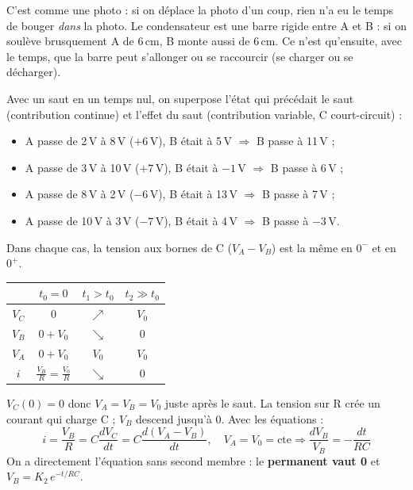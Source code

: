 \begin{goatbox}
C'est comme une photo : si on déplace la photo d'un coup, rien n'a eu le temps de bouger
\emph{dans} la photo. Le condensateur est une barre rigide entre A et B : si on soulève
brusquement A de 6\,cm, B monte aussi de 6\,cm. Ce n'est qu'ensuite, avec le temps, que la
barre peut \og s'allonger ou se raccourcir\fg{} (se charger ou se décharger).
\end{goatbox}


\begin{exbox}[title={Exemples de sauts (superposition : état avant + effet du saut)}]
Avec un saut en un temps nul, on superpose l'état qui précédait le saut (contribution
\og continue\fg{}) et l'effet du saut (contribution \og variable\fg{}, C court-circuit) :
\begin{itemize}
  \item A passe de 2\,V à 8\,V ($+6$\,V), B était à 5\,V $\Rightarrow$ B passe à 11\,V ;
  \item A passe de 3\,V à 10\,V ($+7$\,V), B était à $-1$\,V $\Rightarrow$ B passe à 6\,V ;
  \item A passe de 8\,V à 2\,V ($-6$\,V), B était à 13\,V $\Rightarrow$ B passe à 7\,V ;
  \item A passe de 10\,V à 3\,V ($-7$\,V), B était à 4\,V $\Rightarrow$ B passe à $-3$\,V.
\end{itemize}
Dans chaque cas, la tension aux bornes de C ($V_A - V_B$) est la même en $0^-$ et en $0^+$.
\end{exbox}


\begin{exbox}[title={Analyse complète du passe-haut}]
\begin{center}
\begin{tabular}{c|c|c|c}
 & $t_0 = 0$ & $t_1 > t_0$ & $t_2 \gg t_0$ \\ \hline
$V_C$ & 0 & $\nearrow$ & $V_0$ \\
$V_B$ & $0 + V_0$ & $\searrow$ & 0 \\
$V_A$ & $0 + V_0$ & $V_0$ & $V_0$ \\
$i$ & $\frac{V_B}{R} = \frac{V_0}{R}$ & $\searrow$ & 0 \\
\end{tabular}
\end{center}
$V_C(0) = 0$ donc $V_A = V_B = V_0$ juste après le saut. La tension sur R crée un courant qui
charge C ; $V_B$ descend jusqu'à 0. Avec les équations :
\[ i = \frac{V_B}{R} = C\frac{dV_C}{dt} = C\frac{d(V_A - V_B)}{dt}, \quad V_A = V_0 = \text{cte}
   \Rightarrow \frac{dV_B}{V_B} = -\frac{dt}{RC} \]
On a directement l'équation sans second membre : le \textbf{permanent vaut 0} et
$V_B = K_2\,e^{-t/RC}$.
\end{exbox}

